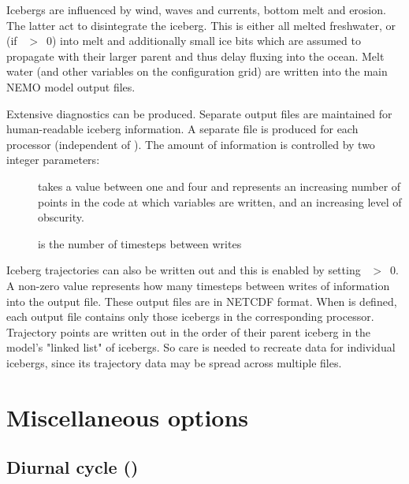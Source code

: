 \documentclass[../tex_main/NEMO_manual]{subfiles}
\begin{document}
Icebergs are influenced by wind, waves and currents, bottom melt and erosion.
The latter act to disintegrate the iceberg.
This is either all melted freshwater,
or (if ~$>$~0) into melt and additionally small ice bits
which are assumed to propagate with their larger parent and thus delay fluxing into the ocean.
Melt water (and other variables on the configuration grid) are written into the main NEMO model output files.

Extensive diagnostics can be produced.
Separate output files are maintained for human-readable iceberg information.
A separate file is produced for each processor (independent of ).
The amount of information is controlled by two integer parameters:
\begin{description}
\item[] takes a value between one and four and
  represents an increasing number of points in the code at which variables are written,
  and an increasing level of obscurity.
\item[] is the number of timesteps between writes
\end{description}

Iceberg trajectories can also be written out and this is enabled by setting ~$>$~0.
A non-zero value represents how many timesteps between writes of information into the output file.
These output files are in NETCDF format.
When  is defined, each output file contains only those icebergs in the corresponding processor.
Trajectory points are written out in the order of their parent iceberg in the model's "linked list" of icebergs.
So care is needed to recreate data for individual icebergs,
since its trajectory data may be spread across multiple files.


\section{Miscellaneous options}
\label{sec:SBC_misc}

\subsection{Diurnal cycle (\protect{})}
\label{subsec:SBC_dcy}
%
\end{document}

